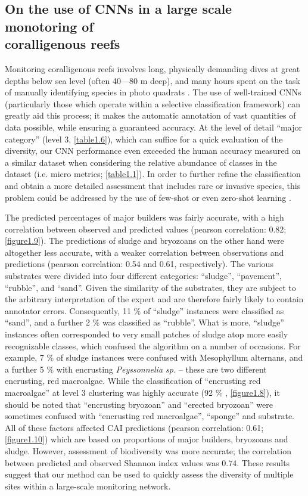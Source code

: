 \subsection{On the use of CNNs in a large scale monotoring of\\ coralligenous reefs}\label{chapitre1_7.4}
Monitoring coralligenous reefs involves long, physically demanding dives at great depths below sea level (often 40---80 m deep), and many hours spent on the task of manually identifying species in photo quadrats \citep{deter_rapid_2012}. The use of well-trained CNNs (particularly those which operate within a selective classification framework) can greatly aid this process; it makes the automatic annotation of vast quantities of data possible, while ensuring a guaranteed accuracy. At the level of detail “major category” (level 3, \autoref{table1.6}), which can suffice for a quick evaluation of the diversity, our CNN performance even exceeded the human accuracy measured on a similar dataset when considering the relative abundance of classes in the dataset (i.e. micro metrics; \autoref{table1.1}). In order to further refine the classification and obtain a more detailed assessment that includes rare or invasive species, this problem could be addressed by the use of few-shot or even zero-shot learning \citep{liu_generalized_2018}.

The predicted percentages of major builders was fairly accurate, with a high correlation between observed and predicted values (pearson correlation: 0.82; \autoref{figure1.9}). The predictions of sludge and bryozoans on the other hand were altogether less accurate, with a weaker correlation between observations and predictions (pearson correlation: 0.54 and 0.61, respectively). The various substrates were divided into four different categories: “sludge”, “pavement”, “rubble”, and “sand”. Given the similarity of the substrates, they are subject to the arbitrary interpretation of the expert and are therefore fairly likely to contain annotator errors. Consequently, 11 \% of “sludge” instances were classified as “sand”, and a further 2 \% was classified as “rubble”. What is more, “sludge” instances often corresponded to very small patches of sludge atop more easily recognizable classes, which confused the algorithm on a number of occasions. For example, 7 \% of sludge instances were confused with Mesophyllum alternans, and a further 5 \% with encrusting \textit{Peyssonnelia sp.} – these are two different encrusting, red macroalgae. While the classification of “encrusting red macroalgae” at level 3 clustering was highly accurate (92 \% , \autoref{figure1.8}), it should be noted that “encrusting bryozoan” and “erected bryozoan” were sometimes confused with “encrusting red macroalgae”, “sponge” and substrate. All of these factors affected CAI predictions (pearson correlation: 0.61; \autoref{figure1.10}) which are based on proportions of major builders, bryozoans and sludge. However, assessment of biodiversity was more accurate; the correlation between predicted and observed Shannon index values was 0.74. These results suggest that our method can be used to quickly assess the diversity of multiple sites within a large-scale monitoring network.

